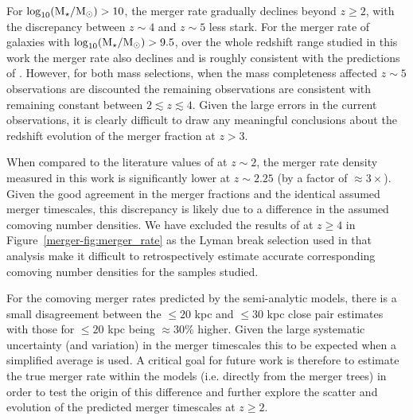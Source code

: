 For $\log_{10}(\text{M}_{\star} / \text{M}_{\odot}) > 10$, the merger rate gradually declines beyond $z\geq 2$, with the discrepancy between $z\sim4$ and $z\sim5$ less stark. For the merger rate of galaxies with $\log_{10}(\text{M}_{\star} / \text{M}_{\odot}) > 9.5$, over the whole redshift range studied in this work the merger rate also declines and is roughly consistent with the predictions of \citet{Lu:2011hj}. However, for both mass selections, when the mass completeness affected $z\sim5$ observations are discounted the remaining observations are consistent with remaining constant between $2 \lesssim z \lesssim 4$. Given the large errors in the current observations, it is clearly difficult to draw any meaningful conclusions about the redshift evolution of the merger fraction at $z > 3$.
  
When compared to the literature values of \citet{RyanJr:2008ka} at $z\sim2$, the merger rate density measured in this work is significantly lower at $z\sim 2.25$ (by a factor of $\approx 3\times$). Given the good agreement in the merger fractions and the identical assumed merger timescales, this discrepancy is likely due to a difference in the assumed comoving number densities. We have excluded the results of \citet{2009MNRAS.397..208C} at $z\geq 4$ in Figure~\ref{merger-fig:merger_rate} as the Lyman break selection used in that analysis make it difficult to retrospectively estimate accurate corresponding comoving number densities for the samples studied.

For the comoving merger rates predicted by the semi-analytic models, there is a small disagreement between the $\leq 20$ kpc and $\leq 30$ kpc close pair estimates with those for $\leq 20$ kpc being $\approx 30\%$ higher. Given the large systematic uncertainty (and variation) in the merger timescales \citep{Lotz:2008kr,Lotz:2010hf,Lotz:2010ie} this to be expected when a simplified average is used. A critical goal for future work is therefore to estimate the true merger rate within the models (i.e. directly from the merger trees) in order to test the origin of this difference and further explore the scatter and evolution of the predicted merger timescales at $z\geq 2$.


